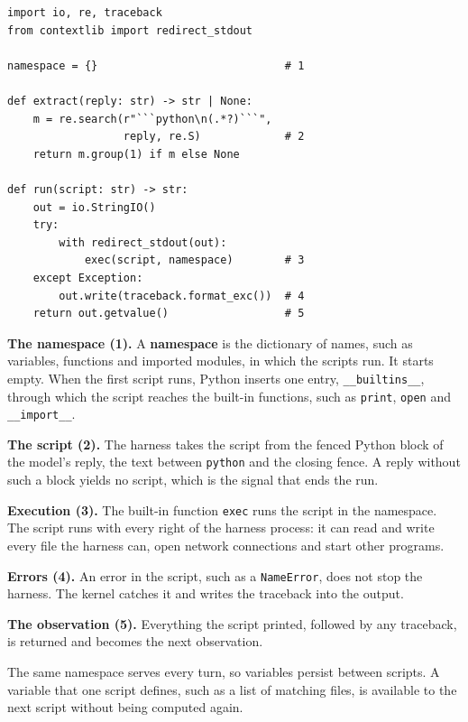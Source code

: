 \begin{lstlisting}[basicstyle=\ttfamily\footnotesize, columns=fixed, basewidth=0.525em, caption={Illustrative minimal kernel. It extracts the script from the model's reply, runs it in one namespace, and returns the output or the traceback.}, label=lst:codeact-kernel]
import io, re, traceback
from contextlib import redirect_stdout

namespace = {}                             # 1

def extract(reply: str) -> str | None:
    m = re.search(r"```python\n(.*?)```",
                  reply, re.S)             # 2
    return m.group(1) if m else None

def run(script: str) -> str:
    out = io.StringIO()
    try:
        with redirect_stdout(out):
            exec(script, namespace)        # 3
    except Exception:
        out.write(traceback.format_exc())  # 4
    return out.getvalue()                  # 5
\end{lstlisting}

\bi
\item \textbf{The namespace (1).} A \textbf{namespace} is the dictionary of names, such as
variables, functions and imported modules, in which the scripts run. It starts empty. When the
first script runs, Python inserts one entry, \texttt{\_\_builtins\_\_}, through which the script
reaches the built-in functions, such as \texttt{print}, \texttt{open} and \texttt{\_\_import\_\_}.
\item \textbf{The script (2).} The harness takes the script from the fenced Python block of the
model's reply, the text between
\texttt{\textasciigrave\textasciigrave\textasciigrave python} and the closing fence. A reply
without such a block yields no script, which is the signal that ends the run.
\item \textbf{Execution (3).} The built-in function \texttt{exec} runs the script in the
namespace. The script runs with every right of the harness process: it can read and write every
file the harness can, open network connections and start other programs.
\item \textbf{Errors (4).} An error in the script, such as a \texttt{NameError}, does not stop the
harness. The kernel catches it and writes the traceback into the output.
\item \textbf{The observation (5).} Everything the script printed, followed by any traceback, is
returned and becomes the next observation.
\ei

The same namespace serves every turn, so variables persist between scripts. A variable that one
script defines, such as a list of matching files, is available to the next script without being
computed again.

